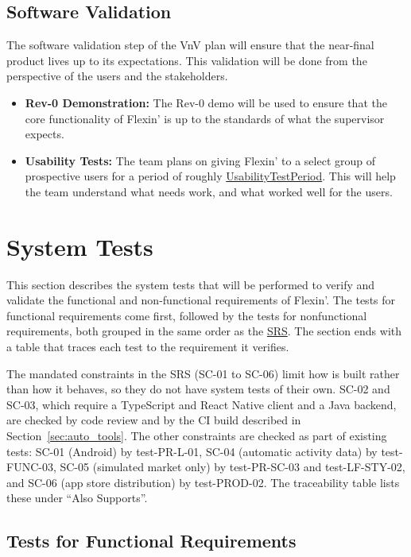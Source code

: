 \documentclass[12pt, titlepage]{article}
\newcommand{\const}[1]{\hyperlink{const:#1}{\textsf{#1}}}
\begin{document}
\subsection{Software Validation}\label{sec:validation}

The software validation step of the VnV plan will ensure that the near-final product lives up to its expectations.
This validation will be done from the perspective of the users and the stakeholders.
\begin{itemize}
  \item \textbf{Rev-0 Demonstration:} The Rev-0 demo will be used to ensure that the core functionality of Flexin' is up to the standards of what the supervisor expects.
  \item \textbf{Usability Tests:} The team plans on giving Flexin' to a select group of prospective users for a period of roughly \const{UsabilityTestPeriod}.
  This will help the team understand what needs work, and what worked well for the users.
\end{itemize}

\section{System Tests}\label{sec:system_tests}

This section describes the system tests that will be performed to verify and validate the functional and non-functional requirements of Flexin'. The tests for functional
requirements come first, followed by the tests for nonfunctional requirements,
both grouped in the same order as the \href{https://github.com/arjunkarthik123/fitness-finance-application/blob/main/pdfs/SRS-Volere/SRS.pdf}{SRS}. The section ends with a
table that traces each test to the requirement it verifies.

The mandated constraints in the SRS (SC-01 to SC-06) limit how \progname{} is
built rather than how it behaves, so they do not have system tests of their
own. SC-02 and SC-03, which require a TypeScript and React Native client and a
Java backend, are checked by code review and by the CI build described in
Section~\ref{sec:auto_tools}. The other constraints are checked as part of
existing tests: SC-01 (Android) by test-PR-L-01, SC-04 (automatic activity data)
by test-FUNC-03, SC-05 (simulated market only) by test-PR-SC-03 and
test-LF-STY-02, and SC-06 (app store distribution) by test-PROD-02. The
traceability table lists these under ``Also Supports''.

\subsection{Tests for Functional Requirements}
\end{document}
